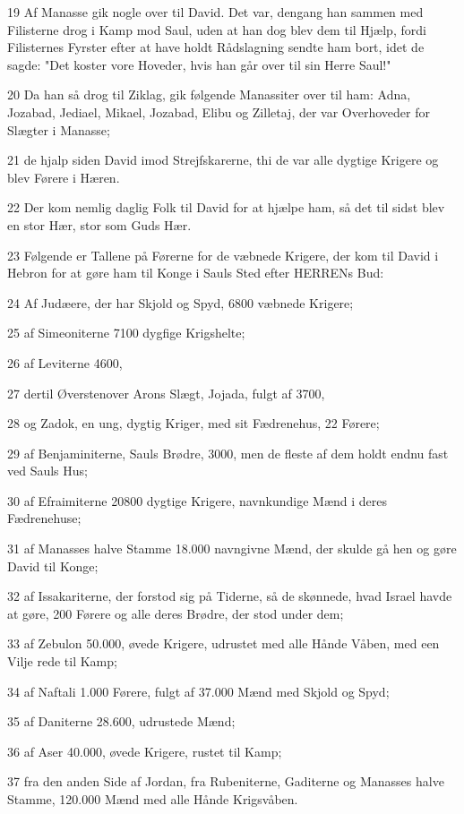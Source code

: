 \par 19 Af Manasse gik nogle over til David. Det var, dengang han sammen med Filisterne drog i Kamp mod Saul, uden at han dog blev dem til Hjælp, fordi Filisternes Fyrster efter at have holdt Rådslagning sendte ham bort, idet de sagde: "Det koster vore Hoveder, hvis han går over til sin Herre Saul!"
\par 20 Da han så drog til Ziklag, gik følgende Manassiter over til ham: Adna, Jozabad, Jediael, Mikael, Jozabad, Elibu og Zilletaj, der var Overhoveder for Slægter i Manasse;
\par 21 de hjalp siden David imod Strejfskarerne, thi de var alle dygtige Krigere og blev Førere i Hæren.
\par 22 Der kom nemlig daglig Folk til David for at hjælpe ham, så det til sidst blev en stor Hær, stor som Guds Hær.
\par 23 Følgende er Tallene på Førerne for de væbnede Krigere, der kom til David i Hebron for at gøre ham til Konge i Sauls Sted efter HERRENs Bud:
\par 24 Af Judæere, der har Skjold og Spyd, 6800 væbnede Krigere;
\par 25 af Simeoniterne 7100 dygfige Krigshelte;
\par 26 af Leviterne 4600,
\par 27 dertil Øverstenover Arons Slægt, Jojada, fulgt af 3700,
\par 28 og Zadok, en ung, dygtig Kriger, med sit Fædrenehus, 22 Førere;
\par 29 af Benjaminiterne, Sauls Brødre, 3000, men de fleste af dem holdt endnu fast ved Sauls Hus;
\par 30 af Efraimiterne 20800 dygtige Krigere, navnkundige Mænd i deres Fædrenehuse;
\par 31 af Manasses halve Stamme 18.000 navngivne Mænd, der skulde gå hen og gøre David til Konge;
\par 32 af Issakariterne, der forstod sig på Tiderne, så de skønnede, hvad Israel havde at gøre, 200 Førere og alle deres Brødre, der stod under dem;
\par 33 af Zebulon 50.000, øvede Krigere, udrustet med alle Hånde Våben, med een Vilje rede til Kamp;
\par 34 af Naftali 1.000 Førere, fulgt af 37.000 Mænd med Skjold og Spyd;
\par 35 af Daniterne 28.600, udrustede Mænd;
\par 36 af Aser 40.000, øvede Krigere, rustet til Kamp;
\par 37 fra den anden Side af Jordan, fra Rubeniterne, Gaditerne og Manasses halve Stamme, 120.000 Mænd med alle Hånde Krigsvåben.
